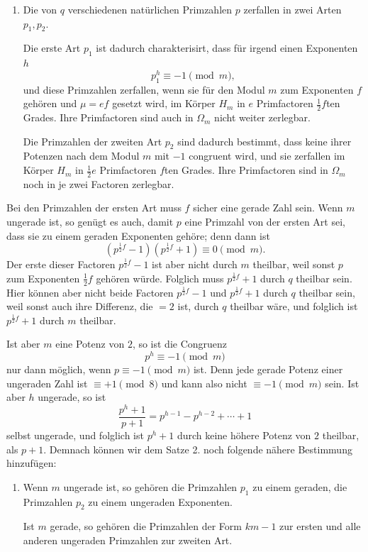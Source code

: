 \documentclass[11pt]{article}
\begin{document}
\begin{enumerate}[label=\arabic*.,leftmargin=2.2em,start=2]
\item Die von $q$ verschiedenen natürlichen Primzahlen $p$ zerfallen in zwei Arten $p_1,p_2$.

Die erste Art $p_1$ ist dadurch charakterisirt, dass für irgend einen Exponenten $h$
\[
p_1^h\equiv -1\pmod m,
\]
und diese Primzahlen zerfallen, wenn sie für den Modul $m$ zum Exponenten $f$ gehören und $\mu=ef$ gesetzt wird, im Körper $H_m$ in $e$ Primfactoren $\frac12 f$ten Grades. Ihre Primfactoren sind auch in $\Omega_m$ nicht weiter zerlegbar.

Die Primzahlen der zweiten Art $p_2$ sind dadurch bestimmt, dass keine ihrer Potenzen nach dem Modul $m$ mit $-1$ congruent wird, und sie zerfallen im Körper $H_m$ in $\frac12e$ Primfactoren $f$ten Grades. Ihre Primfactoren sind in $\Omega_m$ noch in je zwei Factoren zerlegbar.
\end{enumerate}

Bei den Primzahlen der ersten Art muss $f$ sicher eine gerade Zahl sein. Wenn $m$ ungerade ist, so genügt es auch, damit $p$ eine Primzahl von der ersten Art sei, dass sie zu einem geraden Exponenten gehöre; denn dann ist
\[
(p^{\frac12 f}-1)(p^{\frac12 f}+1)\equiv0\pmod m.
\]
Der erste dieser Factoren $p^{\frac12 f}-1$ ist aber nicht durch $m$ theilbar, weil sonst $p$ zum Exponenten $\frac12 f$ gehören würde. Folglich muss $p^{\frac12 f}+1$ durch $q$ theilbar sein. Hier können aber nicht beide Factoren $p^{\frac12 f}-1$ und $p^{\frac12 f}+1$ durch $q$ theilbar sein, weil sonst auch ihre Differenz, die $=2$ ist, durch $q$ theilbar wäre, und folglich ist $p^{\frac12 f}+1$ durch $m$ theilbar.

Ist aber $m$ eine Potenz von $2$, so ist die Congruenz
\[
p^h\equiv -1\pmod m
\]
nur dann möglich, wenn $p\equiv -1\pmod m$ ist. Denn jede gerade Potenz einer ungeraden Zahl ist $\equiv+1\pmod 8$ und kann also nicht $\equiv-1\pmod m$ sein. Ist aber $h$ ungerade, so ist
\[
\frac{p^h+1}{p+1}=p^{h-1}-p^{h-2}+\cdots+1
\]
selbst ungerade, und folglich ist $p^h+1$ durch keine höhere Potenz von $2$ theilbar, als $p+1$. Demnach können wir dem Satze 2. noch folgende nähere Bestimmung hinzufügen:

\begin{enumerate}[label=\arabic*.,leftmargin=2.2em,start=3]
\item Wenn $m$ ungerade ist, so gehören die Primzahlen $p_1$ zu einem geraden, die Primzahlen $p_2$ zu einem ungeraden Exponenten.

Ist $m$ gerade, so gehören die Primzahlen der Form $km-1$ zur ersten und alle anderen ungeraden Primzahlen zur zweiten Art.
\end{enumerate}
\end{document}
